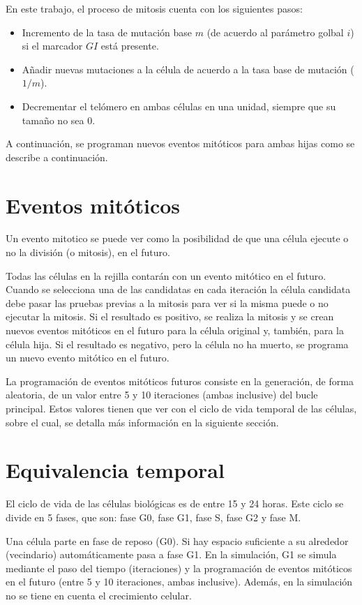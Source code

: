 En este trabajo, el proceso de mitosis cuenta con los siguientes pasos:

\begin{itemize}
    \item Incremento de la tasa de mutación base $m$ (de acuerdo al parámetro golbal $i$) si el marcador
    $GI$ está presente.
    \item Añadir nuevas mutaciones a la célula de acuerdo a la tasa base de mutación ($1/m$).
    \item Decrementar el telómero en ambas células en una unidad, siempre que su tamaño no sea 0.
\end{itemize}

A continuación, se programan nuevos eventos mitóticos para ambas hijas como se describe a continuación.

\section{Eventos mitóticos}

Un evento mitotico se puede ver como la posibilidad de que una célula ejecute o no la división (o mitosis),
en el futuro.

Todas las células en la rejilla contarán con un evento mitótico en el futuro. Cuando se selecciona una
de las candidatas en cada iteración la célula candidata debe pasar las pruebas previas a la mitosis para ver
si la misma puede o no ejecutar la mitosis. Si el resultado es positivo, se realiza la mitosis y se crean
nuevos eventos mitóticos en el futuro para la célula original y, también, para la célula hija.
Si el resultado es negativo, pero la célula no ha muerto, se programa un nuevo evento mitótico en el futuro.

La programación de eventos mitóticos futuros consiste en la generación, de forma aleatoria, de un valor
entre 5 y 10 iteraciones (ambas inclusive) del bucle principal. Estos valores tienen que ver con el ciclo de vida
temporal de las células, sobre el cual, se detalla más información en la siguiente sección.

\section{Equivalencia temporal}

El ciclo de vida de las células biológicas es de entre 15 y 24 horas. Este ciclo se divide en 5 fases, que son:
fase G0, fase G1, fase S, fase G2 y fase M.

Una célula parte en fase de reposo (G0). Si hay espacio suficiente a su alrededor (vecindario) automáticamente pasa
a fase G1. En la simulación, G1 se simula mediante el paso del tiempo (iteraciones) y la programación de
eventos mitóticos en el futuro (entre 5 y 10 iteraciones, ambas inclusive). Además, en la simulación no se
tiene en cuenta el crecimiento celular.

